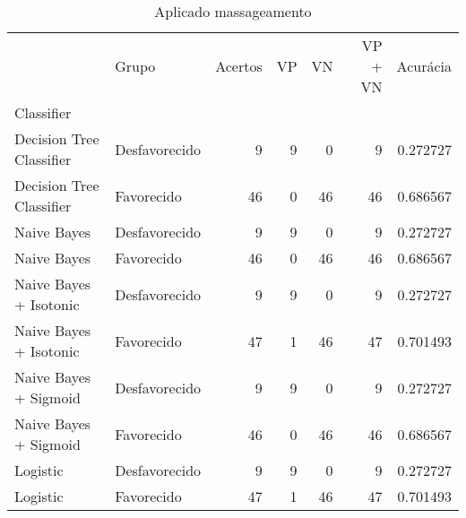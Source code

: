 \begin{table}
\centering
\caption{Aplicado massageamento}
\label{Aplicado massageamento 4}
\begin{tabular}{llrrrrr}
\toprule
{} &          Grupo &  Acertos &  VP  &  VN  &  VP + VN  &  Acurácia \\
Classifier               &                &          &      &      &           &           \\
\midrule
Decision Tree Classifier &  Desfavorecido &        9 &    9 &    0 &         9 &  0.272727 \\
Decision Tree Classifier &     Favorecido &       46 &    0 &   46 &        46 &  0.686567 \\
Naive Bayes              &  Desfavorecido &        9 &    9 &    0 &         9 &  0.272727 \\
Naive Bayes              &     Favorecido &       46 &    0 &   46 &        46 &  0.686567 \\
Naive Bayes + Isotonic   &  Desfavorecido &        9 &    9 &    0 &         9 &  0.272727 \\
Naive Bayes + Isotonic   &     Favorecido &       47 &    1 &   46 &        47 &  0.701493 \\
Naive Bayes + Sigmoid    &  Desfavorecido &        9 &    9 &    0 &         9 &  0.272727 \\
Naive Bayes + Sigmoid    &     Favorecido &       46 &    0 &   46 &        46 &  0.686567 \\
Logistic                 &  Desfavorecido &        9 &    9 &    0 &         9 &  0.272727 \\
Logistic                 &     Favorecido &       47 &    1 &   46 &        47 &  0.701493 \\
\bottomrule
\end{tabular}
\end{table}
